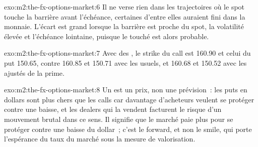 \begin{solution}{exo:m2:the-fx-options-market:6}
Il ne verse rien dans les trajectoires où le spot touche la barrière avant l'échéance, certaines
d'entre elles auraient fini dans la monnaie. L'écart est grand lorsque la barrière
est proche du spot, la volatilité élevée et l'échéance lointaine, puisque le touché est
alors probable.
\end{solution}

\begin{solution}{exo:m2:the-fx-options-market:7}
Avec des , le strike du call est 160.90 et celui du put 150.65, contre 160.85 et
150.71 avec les  usuels, et 160.68 et 150.52 avec les 
ajustés de la prime.
\end{solution}

\begin{solution}{exo:m2:the-fx-options-market:8}
Un  est un prix, non une prévision~: les puts en dollars sont plus chers que les calls
car davantage d'acheteurs veulent se protéger contre une baisse, et les dealers qui la vendent
facturent le risque d'un mouvement brutal dans ce sens. Il signifie que le marché paie plus pour
se protéger contre une baisse du dollar~; c'est le forward, et non le smile, qui porte
l'espérance du taux du marché sous la mesure de valorisation.
\end{solution}

